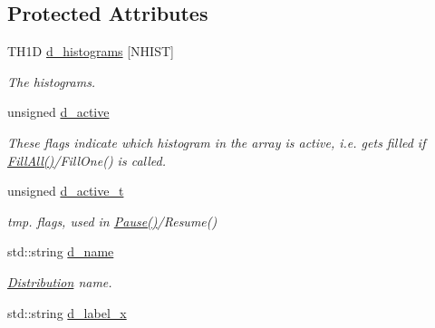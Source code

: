 \subsection*{Protected Attributes}
\begin{DoxyCompactItemize}
\item 
\hypertarget{classHistArray_a53fda50a10b8ba766d44b789313c64c4}{}T\+H1\+D \hyperlink{classHistArray_a53fda50a10b8ba766d44b789313c64c4}{d\+\_\+histograms} \mbox{[}N\+H\+I\+S\+T\mbox{]}\label{classHistArray_a53fda50a10b8ba766d44b789313c64c4}

\begin{DoxyCompactList}\small\item\em The histograms. \end{DoxyCompactList}\item 
\hypertarget{classHistArray_ae6faae6b22f5dc62ba9c664a93e8ea82}{}unsigned \hyperlink{classHistArray_ae6faae6b22f5dc62ba9c664a93e8ea82}{d\+\_\+active}\label{classHistArray_ae6faae6b22f5dc62ba9c664a93e8ea82}

\begin{DoxyCompactList}\small\item\em These flags indicate which histogram in the array is active, i.\+e. gets filled if \hyperlink{classHistArray_ae8d7189d1f2b9710a3228deac3eb1fa4}{Fill\+All()}/\+Fill\+One() is called. \end{DoxyCompactList}\item 
\hypertarget{classHistArray_ac477be77aa121bf1cbeea842debb2579}{}unsigned \hyperlink{classHistArray_ac477be77aa121bf1cbeea842debb2579}{d\+\_\+active\+\_\+t}\label{classHistArray_ac477be77aa121bf1cbeea842debb2579}

\begin{DoxyCompactList}\small\item\em tmp. flags, used in \hyperlink{classHistArray_a27f9acb7029ec4c90b4476e5bc26037d}{Pause()}/\+Resume() \end{DoxyCompactList}\item 
\hypertarget{classHistArray_a725babbcaabff43acabfbcd8a50eaf76}{}std\+::string \hyperlink{classHistArray_a725babbcaabff43acabfbcd8a50eaf76}{d\+\_\+name}\label{classHistArray_a725babbcaabff43acabfbcd8a50eaf76}

\begin{DoxyCompactList}\small\item\em \hyperlink{classDistribution}{Distribution} name. \end{DoxyCompactList}\item 
\hypertarget{classHistArray_abda4dd3f06a82c34fff098de0dbcd75a}{}std\+::string \hyperlink{classHistArray_abda4dd3f06a82c34fff098de0dbcd75a}{d\+\_\+label\+\_\+x}\label{classHistArray_abda4dd3f06a82c34fff098de0dbcd75a}


\end{DoxyCompactItemize}
